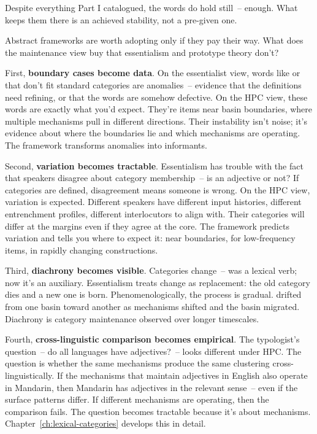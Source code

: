 Despite everything Part I catalogued, the words do hold still~-- enough. What keeps them there is an achieved stability, not a pre-given one.

Abstract frameworks are worth adopting only if they pay their way. What does the maintenance view buy that essentialism and prototype theory don't?

First, \textbf{boundary cases become data}. On the essentialist view, words like  or  that don't fit standard categories are anomalies~-- evidence that the definitions need refining, or that the words are somehow defective. On the HPC view, these words are exactly what you'd expect. They're items near basin boundaries, where multiple mechanisms pull in different directions. Their instability isn't noise; it's evidence about where the boundaries lie and which mechanisms are operating. The framework transforms anomalies into informants.

Second, \textbf{variation becomes tractable}. Essentialism has trouble with the fact that speakers disagree about category membership~-- is  an adjective or not? If categories are defined, disagreement means someone is wrong. On the HPC view, variation is expected. Different speakers have different input histories, different entrenchment profiles, different interlocutors to align with. Their categories will differ at the margins even if they agree at the core. The framework predicts variation and tells you where to expect it: near boundaries, for low-frequency items, in rapidly changing constructions.

Third, \textbf{diachrony becomes visible}. Categories change~--  was a lexical verb; now it's an auxiliary. Essentialism treats change as replacement: the old category dies and a new one is born. Phenomenologically, the process is gradual.  drifted from one basin toward another as mechanisms shifted and the basin migrated. Diachrony is category maintenance observed over longer timescales.

Fourth, \textbf{cross-linguistic comparison becomes empirical}. The typologist's question~-- do all languages have adjectives?~-- looks different under HPC. The question is whether the same mechanisms produce the same clustering cross-linguistically. If the mechanisms that maintain adjectives in English also operate in Mandarin, then Mandarin has adjectives in the relevant sense~-- even if the surface patterns differ. If different mechanisms are operating, then the comparison fails. The question becomes tractable because it's about mechanisms. Chapter~\ref{ch:lexical-categories} develops this in detail.

